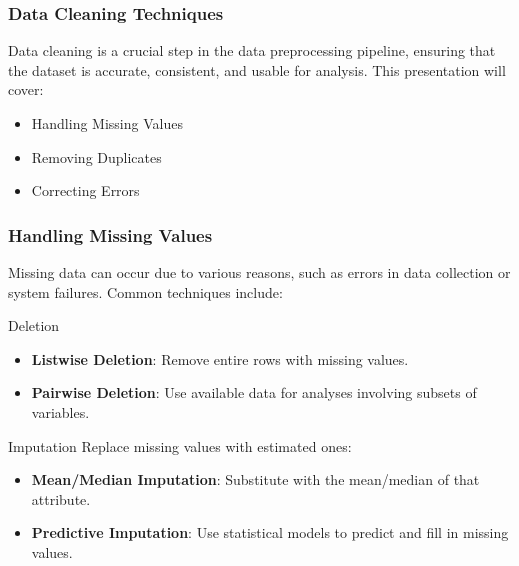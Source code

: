 \documentclass[aspectratio=169]{beamer}
\begin{document}
\begin{frame}
    \frametitle{Data Cleaning Techniques}
    Data cleaning is a crucial step in the data preprocessing pipeline, ensuring that the dataset is accurate, consistent, and usable for analysis. 
    This presentation will cover:
    \begin{itemize}
        \item Handling Missing Values
        \item Removing Duplicates
        \item Correcting Errors
    \end{itemize}
\end{frame}

\begin{frame}
    \frametitle{Handling Missing Values}
    Missing data can occur due to various reasons, such as errors in data collection or system failures. Common techniques include:
    
    \begin{block}{Deletion}
        \begin{itemize}
            \item \textbf{Listwise Deletion}: Remove entire rows with missing values.
            \item \textbf{Pairwise Deletion}: Use available data for analyses involving subsets of variables.
        \end{itemize}
    \end{block}
    
    \begin{block}{Imputation}
        Replace missing values with estimated ones:
        \begin{itemize}
            \item \textbf{Mean/Median Imputation}: Substitute with the mean/median of that attribute.
            \item \textbf{Predictive Imputation}: Use statistical models to predict and fill in missing values.
        \end{itemize}
    \end{block}
\end{frame}
\end{document}
